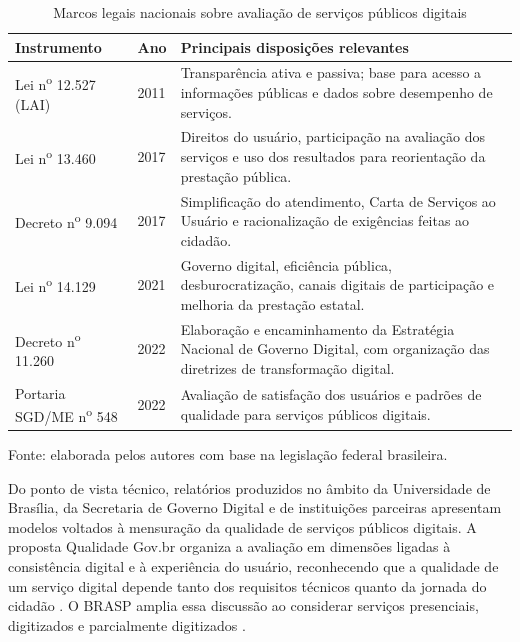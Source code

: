 \begin{table}[htbp]
\centering
\caption{Marcos legais nacionais sobre avaliação de serviços públicos digitais}
\label{tab:marcos-legais-avaliacao}
\small
\begin{tabular}{p{3.2cm} p{1.4cm} p{8.2cm}}
\hline
\textbf{Instrumento} & \textbf{Ano} & \textbf{Principais disposições relevantes} \\
\hline
Lei n\textsuperscript{o} 12.527 (LAI) \cite{brasil2011lei12527} & 2011 &
Transparência ativa e passiva; base para acesso a informações públicas e dados
sobre desempenho de serviços. \\
Lei n\textsuperscript{o} 13.460 \cite{brasil2017lei13460} & 2017 &
Direitos do usuário, participação na avaliação dos serviços e uso dos resultados
para reorientação da prestação pública. \\
Decreto n\textsuperscript{o} 9.094 \cite{brasil2017decreto9094} & 2017 &
Simplificação do atendimento, Carta de Serviços ao Usuário e racionalização de
exigências feitas ao cidadão. \\
Lei n\textsuperscript{o} 14.129 \cite{brasil2021lei14129} & 2021 &
Governo digital, eficiência pública, desburocratização, canais digitais de
participação e melhoria da prestação estatal. \\
Decreto n\textsuperscript{o} 11.260 \cite{brasil2022decreto11260} & 2022 &
Elaboração e encaminhamento da Estratégia Nacional de Governo Digital, com
organização das diretrizes de transformação digital. \\
Portaria SGD/ME n\textsuperscript{o} 548 \cite{brasil2022portaria548} & 2022 &
Avaliação de satisfação dos usuários e padrões de qualidade para serviços
públicos digitais. \\
\hline
\end{tabular}

\footnotesize Fonte: elaborada pelos autores com base na legislação federal
brasileira.
\end{table}

Do ponto de vista técnico, relatórios produzidos no âmbito da Universidade de
Brasília, da Secretaria de Governo Digital e de instituições parceiras
apresentam modelos voltados à mensuração da qualidade de serviços públicos
digitais. A proposta Qualidade Gov.br organiza a avaliação em dimensões ligadas
à consistência digital e à experiência do usuário, reconhecendo que a qualidade
de um serviço digital depende tanto dos requisitos técnicos quanto da jornada do
cidadão \cite{pedrosa2019qualidadeGovbr}. O BRASP amplia essa discussão ao
considerar serviços presenciais, digitizados e parcialmente digitizados
\cite{silva2019brasp}.

